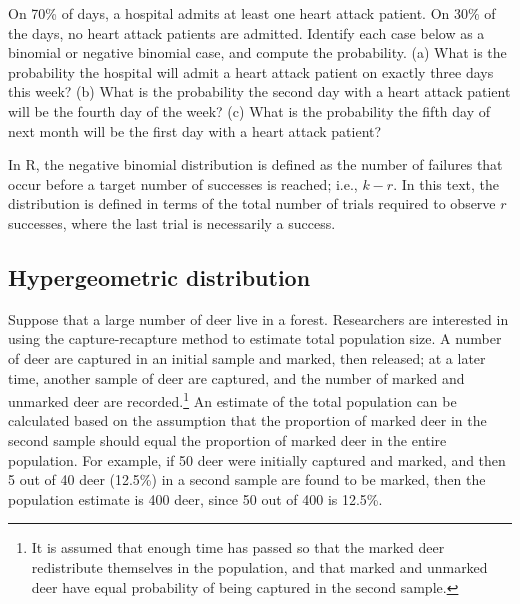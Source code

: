 \begin{exercisewrap}
\begin{nexercise}
On 70\% of days, a hospital admits at least one heart attack patient. On 30\% of the days, no heart attack patients are admitted. Identify each case below as a binomial or negative binomial case, and compute the probability. (a) What is the probability the hospital will admit a heart attack patient on exactly three days this week? (b) What is the probability the second day with a heart attack patient will be the fourth day of the week? (c) What is the probability the fifth day of next month will be the first day with a heart attack patient?\footnotemark{}
\end{nexercise}
\end{exercisewrap}

In \textsf{R}, the negative binomial distribution is defined as the number of failures that occur before a target number of successes is reached; i.e., $k - r$. In this text, the distribution is defined in terms of the total number of trials required to observe $r$ successes, where the last trial is necessarily a success. 



\textD{\newpage}


\subsection{Hypergeometric distribution}
\label{hypergeometric}


Suppose that a large number of deer live in a forest. Researchers are interested in using the capture-recapture method to estimate total population size. A number of deer are captured in an initial sample and marked, then released; at a later time, another sample of deer are captured, and the number of marked and unmarked deer are recorded.\footnote{It is assumed that enough time has passed so that the marked deer redistribute themselves in the population, and that marked and unmarked deer have equal probability of being captured in the second sample.} An estimate of the total population can be calculated based on the assumption that the proportion of marked deer in the second sample should equal the proportion of marked deer in the entire population. For example, if 50 deer were initially captured and marked, and then 5 out of 40 deer (12.5\%) in a second sample are found to be marked, then the population estimate is 400 deer, since 50 out of 400 is 12.5\%.

